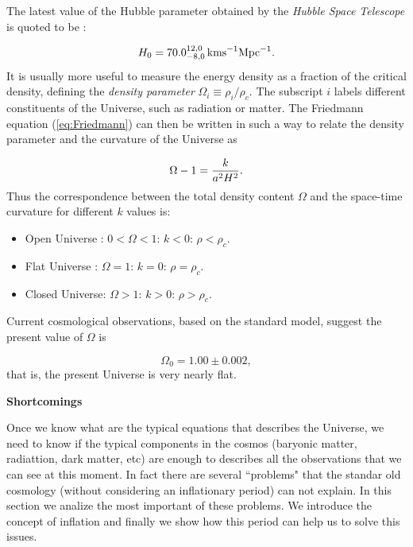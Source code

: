 \documentclass{rmaa}
\def\beq{\begin{equation}}
\def\eeq{\end{equation}}
\begin{document}
\noindent
The latest value of the Hubble parameter obtained by the \textit{Hubble Space Telescope}
is quoted to be \citep{ligo}: 

\beq
 H_0= 70.0^{12,0}_{-8,0} \, {\rm km s}^{-1} {\rm Mpc}^{-1}. 
\eeq
%
It is usually more useful to measure the energy density as a fraction of the critical density,
defining the \textit{density parameter} $\Omega_i\equiv \rho_i / \rho_c$. The subscript $i$ labels
different constituents of the Universe, such as radiation or matter. 
The Friedmann equation (\ref{eq:Friedmann}) can then be written in such a way to
relate the density parameter and the curvature of the Universe as

\begin{equation} \label{eq:curvature}
 \Omega -1={k \over a^2H^2}.
\end{equation}
%
Thus the correspondence between the total density content $\Omega$ and the space-time 
curvature for different $k$ values is: 
\begin{itemize}
\item Open Universe : $0<\Omega<1: \, k<0: \, \rho<\rho_c$. 
\item Flat Universe       : $\Omega=1: \, k=0: \, \rho=\rho_c$. 
\item Closed Universe: $\Omega>1: \, k>0: \, \rho>\rho_c$.
\end{itemize}

   
\noindent
Current cosmological observations, based on the standard model, suggest the present value of 
$\Omega$ is \citep{McCoy}

\beq \label{eq:Omega}
\Omega_0=1.00\pm 0.002,
\eeq
%
that is, the present Universe is very nearly flat.
\\


\begin{center}
\textbf{\large Shortcomings}
\end{center}
Once we know what are the typical equations that describes the Universe, we need to know if the typical components in the cosmos (baryonic matter, radiattion, dark matter, etc) are enough to describes all the observations that we can see at this moment. In fact there are several ``problems" that the standar old cosmology (without considering an inflationary period) can not explain. In this section we analize the most important of these problems. We introduce the concept of inflation and finally we show how this period can help us to solve this issues. 
\vskip 10pt
\end{document}
